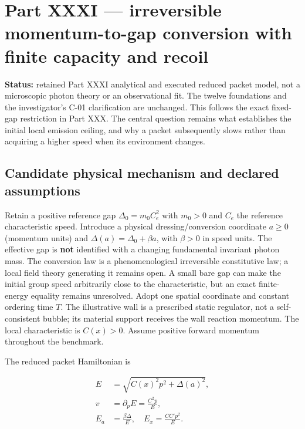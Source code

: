 \documentclass[
  11pt,
  twoside]{article}
\begin{document}
\section{Part XXXI --- irreversible momentum-to-gap conversion with
finite capacity and
recoil}\label{part-xxxi-irreversible-momentum-to-gap-conversion-with-finite-capacity-and-recoil}

\textbf{Status:} retained Part XXXI analytical and executed reduced
packet model, not a microscopic photon theory or an observational fit.
The twelve foundations and the investigator's C-01 clarification are
unchanged. This follows the exact fixed-gap restriction in Part XXX. The
central question remains what establishes the initial local emission
ceiling, and why a packet subsequently slows rather than acquiring a
higher speed when its environment changes.

\subsection{Candidate physical mechanism and declared
assumptions}\label{candidate-physical-mechanism-and-declared-assumptions}

Retain a positive reference gap \(\Delta_0=m_0 C_e^2\) with \(m_0>0\)
and \(C_e\) the reference characteristic speed. Introduce a physical
dressing/conversion coordinate \(a\geq0\) (momentum units) and
\(\Delta(a)=\Delta_0+\beta a\), with \(\beta>0\) in speed units. The
effective gap is \textbf{not} identified with a changing fundamental
invariant photon mass. The conversion law is a phenomenological
irreversible constitutive law; a local field theory generating it
remains open. A small bare gap can make the initial group speed
arbitrarily close to the characteristic, but an exact finite-energy
equality remains unresolved. Adopt one spatial coordinate and constant
ordering time \(T\). The illustrative wall is a prescribed static
regulator, not a self-consistent bubble; its material support receives
the wall reaction momentum. The local characteristic is \(C(x)>0\).
Assume positive forward momentum throughout the benchmark.

The reduced packet Hamiltonian is

\[\begin{aligned}E&=\sqrt{C(x)^2p^2+\Delta(a)^2},\\v&=\partial_p E=\frac{C^2p}{E},\\E_a&=\frac{\beta\Delta}{E},\quad E_x=\frac{CC'p^2}{E}.\end{aligned}\]
\end{document}
